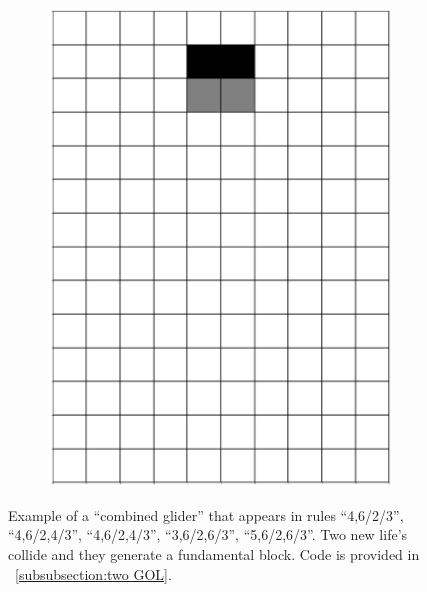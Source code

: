 \documentclass[12pt]{article}
\numberwithin{figure}{section} %
\begin{document}
\begin{figure}[htbp]
\begin{subfigure}{0.23\textwidth}
     		\includegraphics[width=\linewidth]{Section4/37.7}
     		\subcaption{}
   	\end{subfigure}
   	\caption[Example of a "combined glider"]{Example of a “combined glider” that appears in rules “4,6/2/3”, “4,6/2,4/3”, “4,6/2,4/3”, “3,6/2,6/3”, “5,6/2,6/3”. Two new life's collide and they generate a fundamental block. Code is provided in ~\ref{subsubsection:two GOL}. }
   	\label{fig:two GOL}
\end{figure}
\end{document}
